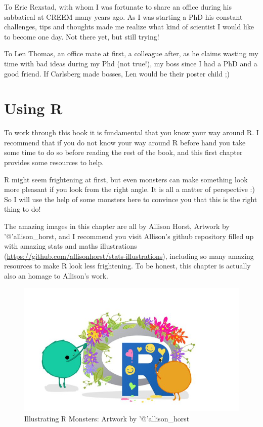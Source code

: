 \documentclass[
]{book}
\begin{document}
To Eric Rexstad, with whom I was fortunate to share an office during his sabbatical at CREEM many years ago. As I was starting a PhD his constant challenges, tips and thoughts made me realize what kind of scientist I would like to become one day. Not there yet, but still trying!

To Len Thomas, an office mate at first, a colleague after, as he claims wasting my time with bad ideas during my Phd (not true!), my boss since I had a PhD and a good friend. If Carlsberg made bosses, Len would be their poster child ;)

\chapter{Using R}\label{usingRintro}

To work through this book it is fundamental that you know your way around R. I recommend that if you do not know your way around R before hand you take some time to do so before reading the rest of the book, and this first chapter provides some resources to help.

R might seem frightening at first, but even monsters can make something look more pleasant if you look from the right angle. It is all a matter of perspective :) So I will use the help of some monsters here to convince you that this is the right thing to do!

The amazing images in this chapter are all by Allison Horst, Artwork by '@'allison\_horst, and I recommend you visit Allison's github repository filled up with amazing stats and maths illustrations (\url{https://github.com/allisonhorst/stats-illustrations}), including so many amazing resources to make R look less frightening. To be honest, this chapter is actually also an homage to Allison's work.

\begin{figure}
\centering
\includegraphics{extfiles/monsteRs.jpg}
\caption{Illustrating R Monsters: Artwork by '@'allison\_horst}
\end{figure}
\end{document}
